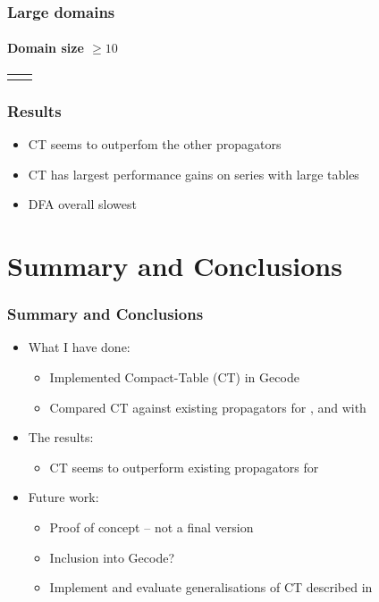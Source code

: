 \documentclass{beamer}
\newcommand{\Table}{\Constraint{Table}}
\begin{document}
\begin{frame}
  \frametitle{Large domains}
  \framesubtitle{Domain size $\geq 10$}
  \begin{tabular}{cc}
    \begin{tikzpicture}[scale=0.5]
      
    \end{tikzpicture}
    &
      \begin{tikzpicture}[scale=0.5]
        
      \end{tikzpicture} \\
  \end{tabular}
\end{frame}

\begin{frame}
  \frametitle{Results}
  \begin{itemize}
    \item CT seems to outperfom the other propagators
    \item CT has largest performance gains on series with large tables
    \item DFA overall slowest
  \end{itemize}
\end{frame}

\section{Summary and Conclusions}

\begin{frame}
  \frametitle{Summary and Conclusions}
  \begin{itemize}
  \item   What I have done:
    \begin{itemize}
    \item Implemented Compact-Table (CT) in Gecode
    \item Compared CT against existing propagators for \Table,
      and with 
    \end{itemize}
  \item   The results:
    \begin{itemize}
      \item CT seems to outperform existing propagators for \Table
    \end{itemize}
    \item Future work:
      \begin{itemize}
      \item Proof of concept -- not a final version
      \item Inclusion into Gecode?
      \item Implement and evaluate generalisations of CT described
        in~\cite{DBLP:conf/aaai/VerhaegheLS17}
      \end{itemize}
  
  \end{itemize}
\end{frame}
\end{document}
